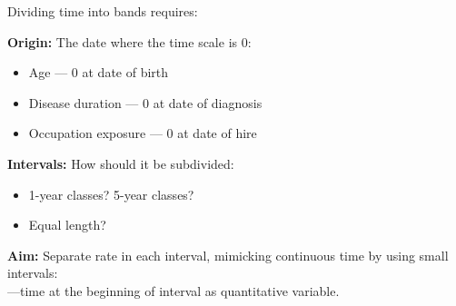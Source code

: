 \begin{frame}{Dividing time into bands requires:}


\pause
\textbf{Origin:} The date where the time scale is $0$: \pause
  \begin{itemize}
  \item Age --- $0$ at date of birth
  \item Disease duration --- $0$ at date of diagnosis
  \item Occupation exposure --- $0$ at date of hire
  \end{itemize}

\pause
\textbf{Intervals:} How should it be subdivided:
 \begin{itemize}
  \item 1-year classes? 5-year classes?
  \item Equal length?
  \end{itemize}

\pause
\textbf{Aim:} Separate rate in each interval, mimicking continuous
time by using small intervals:\\---time at the beginning of interval as
quantitative variable.

\end{frame}


